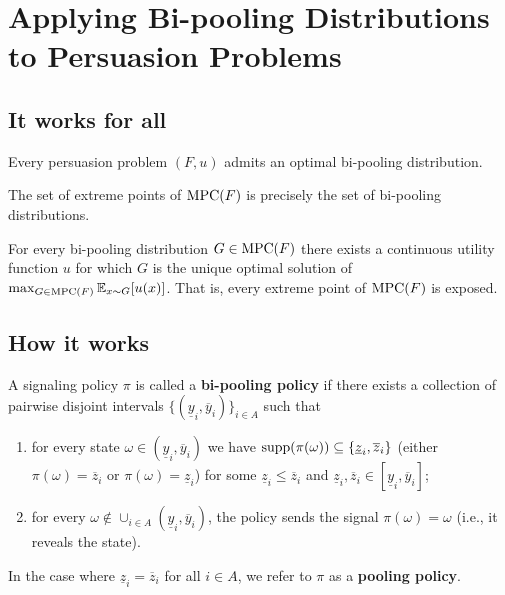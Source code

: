 \documentclass[11pt]{elegantbook}
\begin{document}
\section{Applying Bi-pooling Distributions to Persuasion Problems}
\subsection{It works for all}
\begin{theorem}
    Every persuasion problem $(F,u)$ admits an optimal bi-pooling distribution.
\end{theorem}

\begin{proposition}
    The set of extreme points of $\textnormal{MPC}(F)$ is precisely the set of bi-pooling distributions.
\end{proposition}

\begin{theorem}
    For every bi-pooling distribution $G \in \textnormal{MPC}(F)$ there exists a continuous utility function $u$ for which $G$ is the unique optimal solution of $\max_{G\in \textnormal{MPC}(F)}\mathbb{E}_{x\sim G}[u(x)]$. That is, every extreme point of $\textnormal{MPC}(F)$ is exposed.
\end{theorem}


\subsection{How it works}
\begin{definition}
    \normalfont
    A signaling policy $\pi$ is called a \textbf{bi-pooling policy} if there exists a collection of pairwise disjoint intervals $\{(\underline{y}_i,\overline{y}_i)\}_{i\in A}$ such that
    \begin{enumerate}[$\circ$]
        \item for every state $\omega\in (\underline{y}_i,\overline{y}_i)$ we have $\textnormal{supp}(\pi(\omega))\subseteq\{\underline{z}_i,\overline{z}_i\}$ (either $\pi(\omega)=\overline{z}_i$ or $\pi(\omega)=\underline{z}_i$) for some $\underline{z}_i\leq\overline{z}_i$ and $\underline{z}_i,\overline{z}_i\in [\underline{y}_i,\overline{y}_i]$;
        \item for every $\omega\notin \cup_{i\in A}(\underline{y}_i,\overline{y}_i)$, the policy sends the signal $\pi(\omega) = \omega$ (i.e., it reveals the state).
    \end{enumerate}
    In the case where $\underline{z}_i=\overline{z}_i$ for all $i\in A$, we refer to $\pi$ as a \textbf{pooling policy}.
\end{definition}
\end{document}
